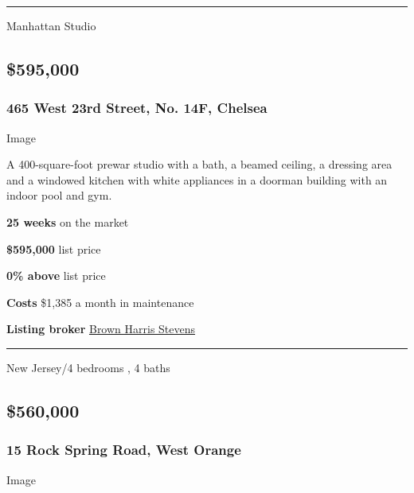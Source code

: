 \begin{center}\rule{0.5\linewidth}{\linethickness}\end{center}

Manhattan \textbar{} Studio

\hypertarget{595000}{%
\subsection{\$595,000}\label{595000}}

\hypertarget{465-west-23rd-street-no-14f-chelsea}{%
\subsubsection{\texorpdfstring{\textbf{465 West 23rd Street, No. 14F,
Chelsea}}{465 West 23rd Street, No. 14F, Chelsea}}\label{465-west-23rd-street-no-14f-chelsea}}

Image

A 400-square-foot prewar studio with a bath, a beamed ceiling, a
dressing area and a windowed kitchen with white appliances in a doorman
building with an indoor pool and gym.

\textbf{25 weeks} on the market

\textbf{\$595,000} list price

\textbf{0\% above} list price

\textbf{Costs} \$1,385 a month in maintenance

\textbf{Listing broker}
\href{https://www.bhsusa.com/closed/manhattan/downtown/465-west-23rd-street-14f/coop/19981542}{Brown
Harris Stevens}

\begin{center}\rule{0.5\linewidth}{\linethickness}\end{center}

New Jersey/4 bedrooms , 4 baths

\hypertarget{560000}{%
\subsection{\$560,000}\label{560000}}

\hypertarget{15-rock-spring-road-west-orange}{%
\subsubsection{\texorpdfstring{\textbf{15 Rock Spring Road, West
Orange}}{15 Rock Spring Road, West Orange}}\label{15-rock-spring-road-west-orange}}

Image

